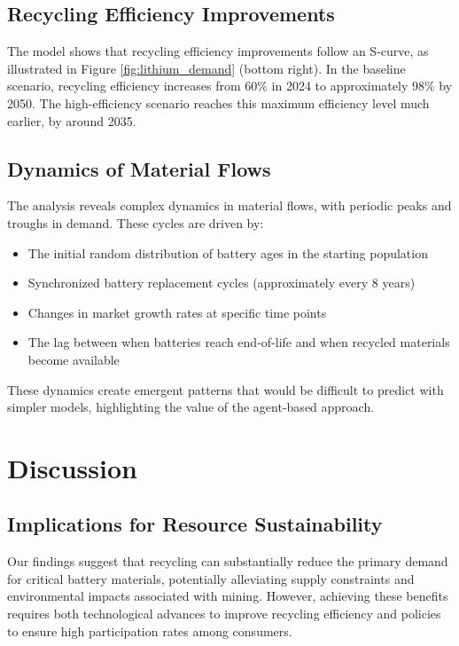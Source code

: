 \documentclass[10pt,a4paper,twocolumn]{article}
\begin{document}
\subsection{Recycling Efficiency Improvements}

The model shows that recycling efficiency improvements follow an S-curve, as illustrated in Figure \ref{fig:lithium_demand} (bottom right). In the baseline scenario, recycling efficiency increases from 60\% in 2024 to approximately 98\% by 2050. The high-efficiency scenario reaches this maximum efficiency level much earlier, by around 2035.

\subsection{Dynamics of Material Flows}

The analysis reveals complex dynamics in material flows, with periodic peaks and troughs in demand. These cycles are driven by:

\begin{itemize}
    \item The initial random distribution of battery ages in the starting population
    \item Synchronized battery replacement cycles (approximately every 8 years)
    \item Changes in market growth rates at specific time points
    \item The lag between when batteries reach end-of-life and when recycled materials become available
\end{itemize}

These dynamics create emergent patterns that would be difficult to predict with simpler models, highlighting the value of the agent-based approach.

\section{Discussion}
\label{sec:discussion}

\subsection{Implications for Resource Sustainability}

Our findings suggest that recycling can substantially reduce the primary demand for critical battery materials, potentially alleviating supply constraints and environmental impacts associated with mining. However, achieving these benefits requires both technological advances to improve recycling efficiency and policies to ensure high participation rates among consumers.
\end{document}
